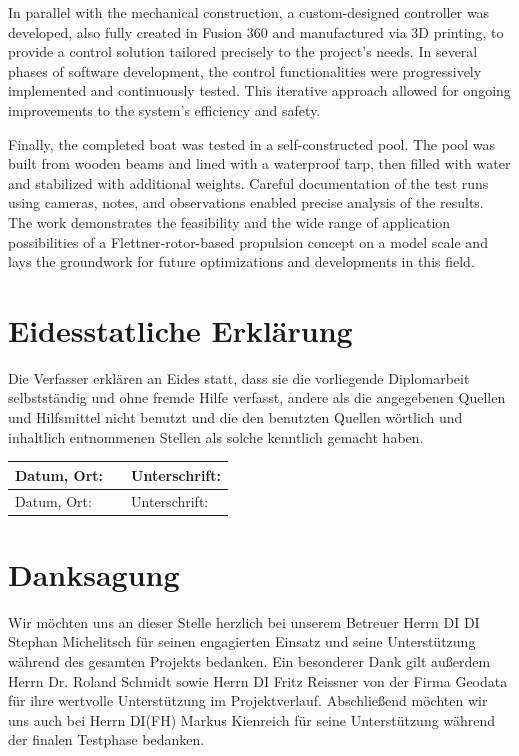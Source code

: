 \documentclass[a4paper,12pt]{article}
\begin{document}
In parallel with the mechanical construction, a custom-designed controller was developed, also fully created in Fusion 360 and manufactured via 3D printing, to provide a control solution tailored precisely to the project's needs. In several phases of software development, the control functionalities were progressively implemented and continuously tested. This iterative approach allowed for ongoing improvements to the system’s efficiency and safety.\newline

Finally, the completed boat was tested in a self-constructed pool. The pool was built from wooden beams and lined with a waterproof tarp, then filled with water and stabilized with additional weights. Careful documentation of the test runs using cameras, notes, and observations enabled precise analysis of the results. The work demonstrates the feasibility and the wide range of application possibilities of a Flettner-rotor-based propulsion concept on a model scale and lays the groundwork for future optimizations and developments in this field.

\newpage

\section*{Eidesstatliche Erklärung}

Die Verfasser erklären an Eides statt, dass sie die vorliegende Diplomarbeit selbstständig und ohne fremde Hilfe verfasst, andere als die angegebenen Quellen und Hilfsmittel nicht benutzt und die den benutzten Quellen wörtlich und inhaltlich entnommenen Stellen als solche kenntlich gemacht haben.\newline


\renewcommand{\arraystretch}{3} %
\begin{tabular}{|p{7.25cm}|p{0.5cm}|p{7.25cm}|}
    \hline
    Datum, Ort: & & Unterschrift: \\ \hline
    Datum, Ort: & & Unterschrift: \\ \hline
\end{tabular}

\newpage

\section*{Danksagung}

Wir möchten uns an dieser Stelle herzlich bei unserem Betreuer Herrn DI DI Stephan Michelitsch für seinen engagierten Einsatz und seine Unterstützung während des gesamten Projekts bedanken.
Ein besonderer Dank gilt außerdem Herrn Dr. Roland Schmidt sowie Herrn DI Fritz Reissner von der Firma Geodata für ihre wertvolle Unterstützung im Projektverlauf.
Abschließend möchten wir uns auch bei Herrn DI(FH) Markus Kienreich für seine Unterstützung während der finalen Testphase bedanken.
\end{document}

